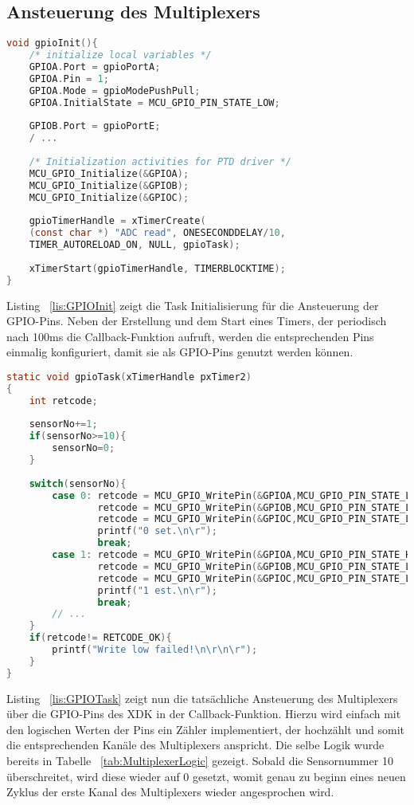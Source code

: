 \subsection{Ansteuerung des Multiplexers}\label{subsec:Ansteuerung des Multiplexers}
\begin{lstlisting}[language=C, caption={GPIO Task Initialisierung}, label=lis:GPIOInit]
void gpioInit(){
	/* initialize local variables */
	GPIOA.Port = gpioPortA;
	GPIOA.Pin = 1;
	GPIOA.Mode = gpioModePushPull;
	GPIOA.InitialState = MCU_GPIO_PIN_STATE_LOW;
	
	GPIOB.Port = gpioPortE;
	/ ...
	
	/* Initialization activities for PTD driver */
	MCU_GPIO_Initialize(&GPIOA);
	MCU_GPIO_Initialize(&GPIOB);
	MCU_GPIO_Initialize(&GPIOC);
	
	gpioTimerHandle = xTimerCreate(
	(const char *) "ADC read", ONESECONDDELAY/10,
	TIMER_AUTORELOAD_ON, NULL, gpioTask);
	
	xTimerStart(gpioTimerHandle, TIMERBLOCKTIME);
}
\end{lstlisting}
Listing ~\ref{lis:GPIOInit} zeigt die Task Initialisierung für die Ansteuerung der \acs{GPIO}-Pins. Neben der Erstellung und dem Start eines Timers, der periodisch nach 100ms die Callback-Funktion aufruft, werden die entsprechenden Pins einmalig konfiguriert, damit sie als \acs{GPIO}-Pins genutzt werden können.
\begin{lstlisting}[language=C, caption={GPIO Task}, label=lis:GPIOTask]
static void gpioTask(xTimerHandle pxTimer2)
{
	int retcode;
	
	sensorNo+=1;
	if(sensorNo>=10){
		sensorNo=0;
	}
	
	switch(sensorNo){
		case 0: retcode = MCU_GPIO_WritePin(&GPIOA,MCU_GPIO_PIN_STATE_LOW);
				retcode = MCU_GPIO_WritePin(&GPIOB,MCU_GPIO_PIN_STATE_LOW);
				retcode = MCU_GPIO_WritePin(&GPIOC,MCU_GPIO_PIN_STATE_LOW);
				printf("0 set.\n\r");
				break;
		case 1: retcode = MCU_GPIO_WritePin(&GPIOA,MCU_GPIO_PIN_STATE_HIGH);
				retcode = MCU_GPIO_WritePin(&GPIOB,MCU_GPIO_PIN_STATE_LOW);
				retcode = MCU_GPIO_WritePin(&GPIOC,MCU_GPIO_PIN_STATE_LOW);
				printf("1 est.\n\r");
				break;
		// ...
	}
	if(retcode!= RETCODE_OK){
		printf("Write low failed!\n\r\n\r");
	}
}
\end{lstlisting}
Listing ~\ref{lis:GPIOTask} zeigt nun die tatsächliche Ansteuerung des Multiplexers über die \acs{GPIO}-Pins des \acs{XDK} in der Callback-Funktion. Hierzu wird einfach mit den logischen Werten der Pins ein Zähler implementiert, der hochzählt und somit die entsprechenden Kanäle des Multiplexers anspricht. Die selbe Logik wurde bereits in Tabelle ~\ref{tab:MultiplexerLogic} gezeigt. Sobald die Sensornummer 10 überschreitet, wird diese wieder auf 0 gesetzt, womit genau zu beginn eines neuen Zyklus der erste Kanal des Multiplexers wieder angesprochen wird.

